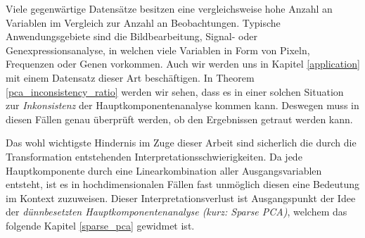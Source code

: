 Viele gegenwärtige Datensätze besitzen eine vergleichsweise hohe Anzahl an Variablen im Vergleich zur Anzahl an Beobachtungen. Typische Anwendungsgebiete sind die Bildbearbeitung, Signal- oder  Genexpressionsanalyse, in welchen viele Variablen in Form von Pixeln, Frequenzen oder Genen vorkommen. Auch wir werden uns in Kapitel \ref{application} mit einem Datensatz dieser Art beschäftigen. In Theorem \ref{pca_inconsistency_ratio} werden wir sehen, dass es in einer solchen Situation zur \textit{Inkonsistenz} der Hauptkomponentenanalyse kommen kann. Deswegen muss in diesen Fällen genau überprüft werden, ob den Ergebnissen getraut werden kann.

Das wohl wichtigste Hindernis im Zuge dieser Arbeit sind sicherlich die durch die Transformation entstehenden Interpretationsschwierigkeiten. Da jede Hauptkomponente durch eine Linearkombination aller Ausgangsvariablen entsteht, ist es in hochdimensionalen Fällen fast unmöglich diesen eine Bedeutung im Kontext zuzuweisen. Dieser Interpretationsverlust ist Ausgangspunkt der Idee der \textit{dünnbesetzten Hauptkomponentenanalyse (kurz: {Sparse PCA})}, welchem das folgende Kapitel \ref{sparse_pca} gewidmet ist.




